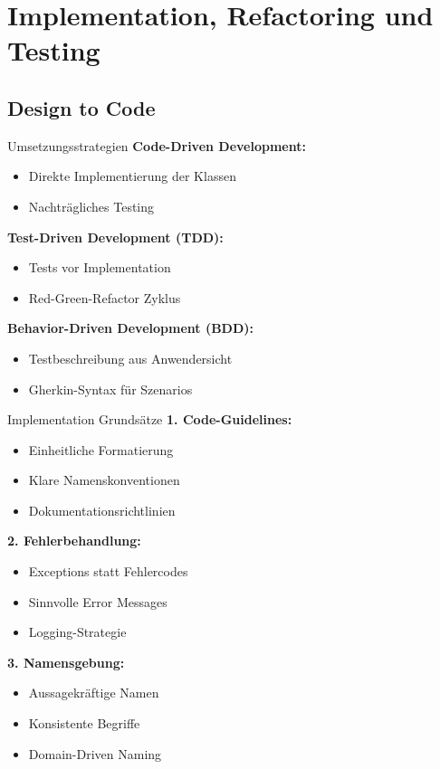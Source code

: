 \section{Implementation, Refactoring und Testing}

\subsection{Design to Code}

\begin{concept}{Umsetzungsstrategien}
\textbf{Code-Driven Development:}
\begin{itemize}
    \item Direkte Implementierung der Klassen
    \item Nachträgliches Testing
\end{itemize}

\textbf{Test-Driven Development (TDD):}
\begin{itemize}
    \item Tests vor Implementation
    \item Red-Green-Refactor Zyklus
\end{itemize}

\textbf{Behavior-Driven Development (BDD):}
\begin{itemize}
    \item Testbeschreibung aus Anwendersicht
    \item Gherkin-Syntax für Szenarios
\end{itemize}
\end{concept}

\begin{KR}{Implementation Grundsätze}
\textbf{1. Code-Guidelines:}
\begin{itemize}
    \item Einheitliche Formatierung
    \item Klare Namenskonventionen
    \item Dokumentationsrichtlinien
\end{itemize}

\textbf{2. Fehlerbehandlung:}
\begin{itemize}
    \item Exceptions statt Fehlercodes
    \item Sinnvolle Error Messages
    \item Logging-Strategie
\end{itemize}

\textbf{3. Namensgebung:}
\begin{itemize}
    \item Aussagekräftige Namen
    \item Konsistente Begriffe
    \item Domain-Driven Naming
\end{itemize}
\end{KR}

